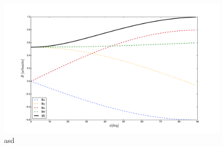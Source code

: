 	
	
% 	
% 	
% 	
	
	\begin{figure}[ht!]
		\centering
		\includegraphics[width=\textwidth]{./fig/EASRadio/geomComps_Malarge}
		\caption{\label{fig:geomComps_Malarge}
		asd
		}
	\end{figure}
	
